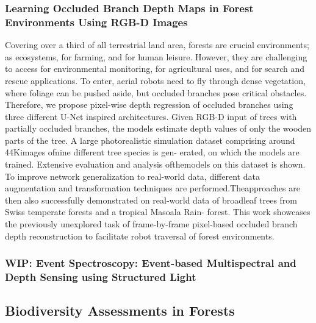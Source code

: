 \subsubsection{Learning Occluded Branch Depth Maps in Forest Environments Using RGB-D Images \cite{Geckeler2024}}
Covering over a third of all terrestrial land area, forests are crucial environments; as ecosystems, for farming, and for human leisure. However, they are challenging to access for environmental monitoring, for agricultural uses, and for search and rescue applications. To enter, aerial robots need to fly through dense vegetation, where foliage can be pushed aside, but occluded branches pose critical obstacles. Therefore, we propose pixel-wise depth regression of occluded branches using three different U-Net inspired architectures. Given RGB-D input of trees with partially occluded branches, the models estimate depth values of only the wooden parts of the tree. A large photorealistic simulation dataset comprising around 44Kimages ofnine different tree species is gen- erated, on which the models are trained. Extensive evaluation and analysis ofthemodels on this dataset is shown. To improve network generalization to real-world data, different data augmentation and transformation techniques are performed.Theapproaches are then also successfully demonstrated on real-world data of broadleaf trees from Swiss temperate forests and a tropical Masoala Rain- forest. This work showcases the previously unexplored task of frame-by-frame pixel-based occluded branch depth reconstruction to facilitate robot traversal of forest environments.

\subsubsection{WIP: Event Spectroscopy: Event-based Multispectral and Depth Sensing using Structured Light}

\subsection{Biodiversity Assessments in Forests}

